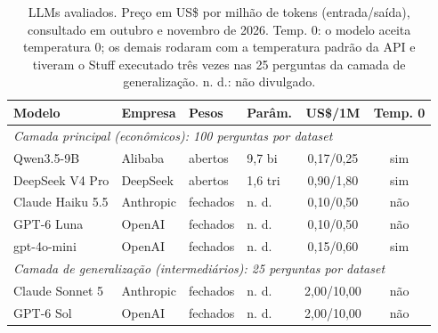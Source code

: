 \begin{table}[!t]
\centering
\footnotesize
\setlength{\tabcolsep}{1.8pt}
\caption{LLMs avaliados. Preço em US\$ por milhão de tokens (entrada/saída), consultado em outubro e novembro de 2026. Temp. 0: o modelo aceita temperatura 0; os demais rodaram com a temperatura padrão da API e tiveram o Stuff executado três vezes nas 25 perguntas da camada de generalização. n. d.: não divulgado.}
\label{tab:llms}
\begin{tabular}{llllcc}
\toprule
Modelo & Empresa & Pesos & Parâm. & US\$/1M & Temp. 0 \\
\midrule
\multicolumn{6}{l}{\emph{Camada principal (econômicos): 100 perguntas por dataset}} \\
Qwen3.5-9B & Alibaba & abertos & 9,7 bi & 0,17/0,25 & sim \\
DeepSeek V4 Pro & DeepSeek & abertos & 1,6 tri & 0,90/1,80 & sim \\
Claude Haiku 5.5 & Anthropic & fechados & n. d. & 0,10/0,50 & não \\
GPT-6 Luna & OpenAI & fechados & n. d. & 0,10/0,50 & não \\
gpt-4o-mini & OpenAI & fechados & n. d. & 0,15/0,60 & sim \\
\multicolumn{6}{l}{\emph{Camada de generalização (intermediários): 25 perguntas por dataset}} \\
Claude Sonnet 5 & Anthropic & fechados & n. d. & 2,00/10,00 & não \\
GPT-6 Sol & OpenAI & fechados & n. d. & 2,00/10,00 & não \\
\bottomrule
\end{tabular}
\end{table}
